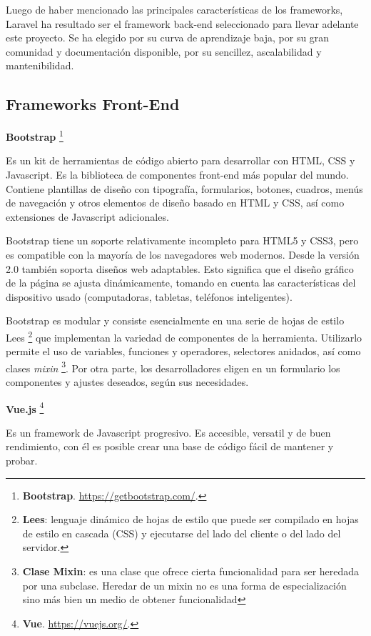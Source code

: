 \documentclass[11pt,oneside]{book}
\begin{document}
Luego de haber mencionado las principales características de los frameworks, Laravel ha resultado ser el framework back-end seleccionado para llevar adelante este proyecto. Se ha elegido por su curva de aprendizaje baja, por su gran comunidad y documentación disponible, por su sencillez, ascalabilidad y mantenibilidad.

\subsection{Frameworks Front-End}
\textbf{Bootstrap} \footnote{\textbf{Bootstrap}. \url{https://getbootstrap.com/}.}

Es un kit de herramientas de código abierto para desarrollar con HTML, CSS y Javascript. Es la biblioteca de componentes front-end más popular del mundo. Contiene plantillas de diseño con tipografía, formularios, botones, cuadros, menús de navegación y otros elementos de diseño basado en HTML y CSS, así como extensiones de Javascript adicionales.

Bootstrap tiene un soporte relativamente incompleto para HTML5 y CSS3, pero es compatible con la mayoría de los navegadores web modernos. Desde la versión 2.0 también soporta diseños web adaptables. Esto significa que el diseño gráfico de la página se ajusta dinámicamente, tomando en cuenta las características del dispositivo usado (computadoras, tabletas, teléfonos inteligentes).

Bootstrap es modular y consiste esencialmente en una serie de hojas de estilo Lees \footnote{\textbf{Lees}: lenguaje dinámico de hojas de estilo que puede ser compilado en hojas de estilo en cascada (CSS) y ejecutarse del lado del cliente o del lado del servidor.} que implementan la variedad de componentes de la herramienta. Utilizarlo permite el uso de variables, funciones y operadores, selectores anidados, así como clases \textit{mixin} \footnote{\textbf{Clase Mixin}: es una clase que ofrece cierta funcionalidad para ser heredada por una subclase. Heredar de un mixin no es una forma de especialización sino más bien un medio de obtener funcionalidad}. Por otra parte, los desarrolladores eligen en un formulario los componentes y ajustes deseados, según sus necesidades.

\newpage
\textbf{Vue.js} \footnote{\textbf{Vue}. \url{https://vuejs.org/}.}

Es un framework de Javascript progresivo. Es accesible, versatil y de buen rendimiento, con él es posible crear una base de código fácil de mantener y probar.
\end{document}
